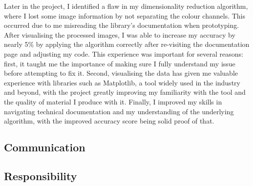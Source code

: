 \documentclass[12pt]{article}
\begin{document}
    Later in the project, I identified a flaw in my dimensionality reduction algorithm, where I lost some image information
    by not separating the colour channels.
    This occurred due to me misreading the library's documentation when prototyping.
    After visualising the processed images, I was able to increase my accuracy by nearly 5\% by applying the algorithm
    correctly after re-visiting the documentation page and adjusting my code.
    This experience was important for several reasons: first, it taught me the importance of making sure I fully understand
    my issue before attempting to fix it.
    Second, visualising the data has given me valuable experience with libraries such as Matplotlib, a tool widely used in
    the industry and beyond, with the project greatly improving my familiarity with the tool and the quality of material I produce with it.
    Finally, I improved my skills in navigating technical documentation and my understanding of the underlying algorithm, with the improved
    accuracy score being solid proof of that.

    \subsection{Communication}
    \label{subsec:communication}

    \subsection{Responsibility}
    \label{subsec:responsibility}
\end{document}
